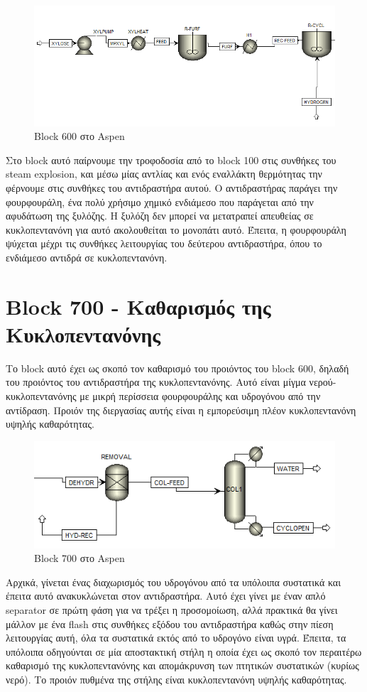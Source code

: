 \documentclass[11pt]{article}
\begin{document}
\begin{figure}[htbp]
\centering
\includegraphics[width=.9\linewidth]{Block_600_-_Παραγωγή_Κυκλοπεντανόνης_με_την_Φουρφουράλη_ως_Ενδιάμεσο/2023-01-10_20-03-27_screenshot.png}
\caption{Block 600 στο Aspen}
\end{figure}

Στο block αυτό παίρνουμε την τροφοδοσία από το block 100 στις συνθήκες του steam explosion, και μέσω μίας αντλίας και ενός εναλλάκτη θερμότητας την φέρνουμε στις συνθήκες του αντιδραστήρα αυτού. Ο αντιδραστήρας παράγει την φουρφουράλη, ένα πολύ χρήσιμο χημικό ενδιάμεσο που παράγεται από την αφυδάτωση της ξυλόζης. Η ξυλόζη δεν μπορεί να μετατραπεί απευθείας σε κυκλοπεντανόνη για αυτό ακολουθείται το μονοπάτι αυτό. Έπειτα, η φουρφουράλη ψύχεται μέχρι τις συνθήκες λειτουργίας του δεύτερου αντιδραστήρα, όπου το ενδιάμεσο αντιδρά σε κυκλοπεντανόνη.

\section{Block 700 - Καθαρισμός της Κυκλοπεντανόνης}
\label{sec:org58734e2}
Το block αυτό έχει ως σκοπό τον καθαρισμό του προιόντος του block 600, δηλαδή του προιόντος του αντιδραστήρα της κυκλοπεντανόνης. Αυτό είναι μίγμα νερού-κυκλοπεντανόνης με μικρή περίσσεια φουρφουράλης και υδρογόνου από την αντίδραση. Προιόν της διεργασίας αυτής είναι η εμπορεύσιμη πλέον κυκλοπεντανόνη υψηλής καθαρότητας.

\begin{figure}[htbp]
\centering
\includegraphics[width=.9\linewidth]{Block_800_-_Καθαρισμός_της_Κυκλοπεντανόνης/2023-01-10_19-56-21_screenshot.png}
\caption{Block 700 στο Aspen}
\end{figure}


Αρχικά, γίνεται ένας διαχωρισμός του υδρογόνου από τα υπόλοιπα συστατικά και έπειτα αυτό ανακυκλώνεται στον αντιδραστήρα. Αυτό έχει γίνει με έναν απλό separator σε πρώτη φάση για να τρέξει η προσομοίωση, αλλά πρακτικά θα γίνει μάλλον με ένα flash στις συνθήκες εξόδου του αντιδραστήρα καθώς στην πίεση λειτουργίας αυτή, όλα τα συστατικά εκτός από το υδρογόνο είναι υγρά. Έπειτα, τα υπόλοιπα οδηγούνται σε μία αποστακτική στήλη η οποία έχει ως σκοπό τον περαιτέρω καθαρισμό της κυκλοπεντανόνης και απομάκρυνση των πτητικών συστατικών (κυρίως νερό). Το προιόν πυθμένα της στήλης είναι κυκλοπεντανόνη υψηλής καθαρότητας.
\end{document}
